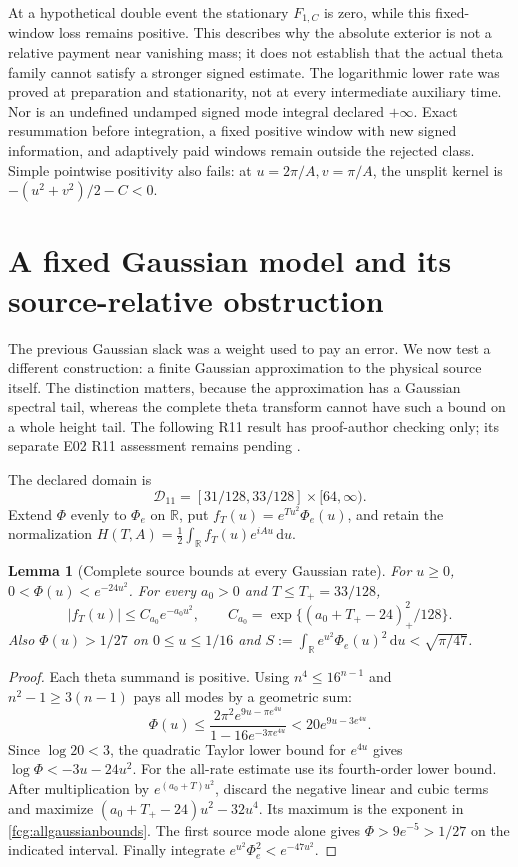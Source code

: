 \documentclass[11pt]{article}
\numberwithin{equation}{section}
\newtheorem{lemma}[theorem]{Lemma}
\newcommand{\dd}{\,\mathrm d}
\newcommand{\R}{\mathbb R}
\begin{document}
At a hypothetical double event the stationary $F_{1,C}$ is zero,
while this fixed-window loss remains positive. This describes why the
absolute exterior is not a relative payment near vanishing mass;
it does not establish that the actual theta family cannot satisfy a
stronger signed estimate. The logarithmic lower rate was proved at
preparation and stationarity, not at every intermediate auxiliary time.
Nor is an undefined undamped signed mode integral declared $+\infty$.
Exact resummation before integration, a fixed positive window with
new signed information, and adaptively paid windows remain outside
the rejected class. Simple pointwise positivity also fails: at
$u=2\pi/A,v=\pi/A$, the unsplit kernel is
$-(u^2+v^2)/2-C<0$.

\section{A fixed Gaussian model and its source-relative obstruction}
\label{fcg:gaussianmodel}

The previous Gaussian slack was a weight used to pay an error. We
now test a different construction: a finite Gaussian approximation
to the physical source itself. The distinction matters, because the
approximation has a Gaussian spectral tail, whereas the complete
theta transform cannot have such a bound on a whole height tail.
The following R11 result has proof-author checking only; its separate
E02 R11 assessment remains pending \cite{FCGFixedGaussian}.

The declared domain is
\begin{equation}\label{fcg:r11domain}
 \mathcal D_{11}=[31/128,33/128]\times[64,\infty).
\end{equation}
Extend $\Phi$ evenly to $\Phi_e$ on $\R$, put
$f_T(u)=e^{Tu^2}\Phi_e(u)$, and retain the normalization
$H(T,A)=\frac12\int_\R f_T(u)e^{iAu}\dd u$.

\begin{lemma}[Complete source bounds at every Gaussian rate]
\label{fcg:everygaussian}
For $u\ge0$, $0<\Phi(u)<e^{-24u^2}$. For every $a_0>0$ and
$T\le T_+=33/128$,
\begin{equation}\label{fcg:allgaussianbounds}
 |f_T(u)|\le C_{a_0}e^{-a_0u^2},\qquad
 C_{a_0}=\exp\{(a_0+T_+-24)_+^2/128\}.
\end{equation}
Also $\Phi(u)>1/27$ on $0\le u\le1/16$ and
$S:=\int_\R e^{u^2}\Phi_e(u)^2\dd u<\sqrt{\pi/47}$.
\end{lemma}
\begin{proof}
Each theta summand is positive. Using $n^4\le16^{n-1}$ and
$n^2-1\ge3(n-1)$ pays all modes by a geometric sum:
\[
 \Phi(u)\le\frac{2\pi^2e^{9u-\pi e^{4u}}}
                       {1-16e^{-3\pi e^{4u}}}
       <20e^{9u-3e^{4u}}.
\]
Since $\log20<3$, the quadratic Taylor lower bound for $e^{4u}$
gives $\log\Phi<-3u-24u^2$. For the all-rate estimate use its
fourth-order lower bound. After multiplication by $e^{(a_0+T)u^2}$,
discard the negative linear and cubic terms and maximize
$(a_0+T_+-24)u^2-32u^4$. Its maximum is the exponent in
\eqref{fcg:allgaussianbounds}. The first source mode alone gives
$\Phi>9e^{-5}>1/27$ on the indicated interval. Finally integrate
$e^{u^2}\Phi_e^2<e^{-47u^2}$.
\end{proof}
\end{document}

